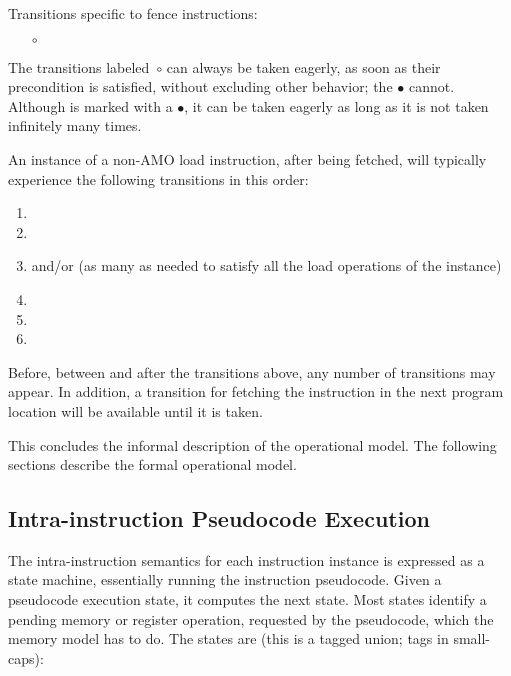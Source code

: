 \noindent Transitions specific to fence instructions:
\begin{itemize}
\item[$\circ$] 
\end{itemize}

The transitions labeled~$\circ$ can always be taken eagerly, as soon as their precondition is satisfied, without excluding other behavior; the $\bullet$ cannot.
Although  is marked with a $\bullet$, it can be taken eagerly as long as it is not taken infinitely many times.

An instance of a non-AMO load instruction, after being fetched, will typically experience the following transitions in this order:
\begin{enumerate}
\item {}
\item {}
\item {} and/or  (as many as needed to satisfy all the load operations of the instance)
\item {}
\item {}
\item {}
\end{enumerate}
Before, between and after the transitions above, any number of  transitions may appear.
In addition, a  transition for fetching the instruction in the next program location will be available until it is taken.


This concludes the informal description of the operational model.
The following sections describe the formal operational model.

\subsection{Intra-instruction Pseudocode Execution}\label{sec:omm:pseudocode_exec}
The intra-instruction semantics for each instruction instance is expressed as a state machine, essentially running the instruction pseudocode.
Given a pseudocode execution state, it computes the next state.  Most
states identify a pending memory or register operation, requested by
the pseudocode, which the memory model has to do.  The
states are (this is a tagged union; tags in small-caps):

